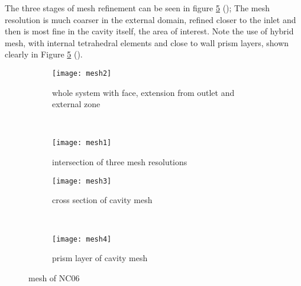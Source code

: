 The three stages of mesh refinement can be seen in figure \ref{fig:cavme} (); The mesh resolution is much coarser in the external domain, refined closer to the inlet and then is most fine in the cavity itself, the area of interest. Note the use of hybrid mesh, with internal tetrahedral elements and close to wall prism layers, shown clearly in Figure \ref{fig:cavme} ().

\begin{figure}
  \begin{subfigure}[t]{0.5\textwidth}
    \texttt{[image: mesh2]}
    \caption{whole system with face, extension from outlet and external zone}
    \label{fig:mesh1}
  \end{subfigure}%
  ~%
  \begin{subfigure}[t]{0.5\textwidth}
    \texttt{[image: mesh1]}
    \caption{intersection of three mesh resolutions}
    \label{fig:mesh2}
  \end{subfigure}

  \begin{subfigure}[t]{0.5\textwidth}
    \texttt{[image: mesh3]}
    \caption{cross section of cavity mesh}
    \label{fig:mesh3}
  \end{subfigure}%
  ~%
  \begin{subfigure}[t]{0.5\textwidth}
    \texttt{[image: mesh4]}
    \caption{prism layer of cavity mesh}
    \label{fig:mesh4}
  \end{subfigure}
  \caption{mesh of NC06} \label{fig:cavme}
\end{figure}
